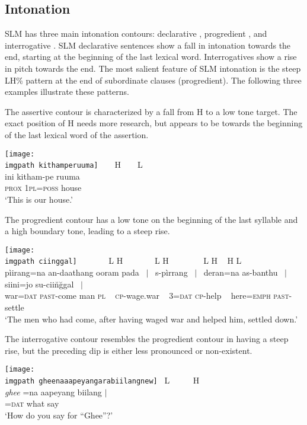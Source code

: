 \subsection{Intonation}
SLM has three main intonation contours: 
declarative , 
progredient , and
interrogative .
SLM declarative sentences show a fall in intonation towards the end, starting at the beginning of the last lexical word. Interrogatives show a rise in pitch towards the end. The most salient feature of SLM intonation is the steep LH\% pattern at the end of subordinate clauses (progredient). The following three examples illustrate these patterns.

The assertive contour is characterized by a fall from H to a low  tone target. The exact position of H needs more research, but appears to be towards the beginning of the last lexical word of the assertion.


\ea \label{ex:phon:int:declarative}
 \texttt{[image: \\imgpath kithamperuuma]}
\glll    ~   ~         H~~~~L\\
	 ini kitham-pe ruuma \\
     \textsc{prox} \textsc{1pl=poss} house  \\
    `This is our house.'
\z


The progredient contour has a low tone on the beginning of the last syllable and a high boundary tone, leading to a steep rise.


\ea \label{ex:phon:int:progredient}
 \texttt{[image: \\imgpath ciinggal]}
\glll 	~ ~	~	~~L	H	~~~~~~~L	H	~	  ~~~~~~L 	H	~	H 		L\\
       pìirang=na an-daathang ooram pada $~\mid~$ s-pìrrang $~\mid~$  deran=na as-banthu $~\mid~$  siini=jo su-cii\u n\u ggal $~\mid$ \\
      war=\textsc{dat} \textsc{past}-come man \textsc{pl} ~ \textsc{cp}-wage.war ~ 3=\textsc{dat} \textsc{cp}-help ~ here=\textsc{emph} \textsc{past}-settle  \\
    `The men who had come, after having waged war and helped him, settled down.' 
\z


The interrogative contour resembles the progredient contour in having a steep rise, but the preceding dip is either less pronounced or non-existent.


\ea \label{ex:phon:int:interrogative}
 \texttt{[image: \\imgpath gheenaaapeyangarabiilangnew]}
\glll       ~L  		~  ~     ~        H \\
	{\em ghee} =na aapeyang biilang $\mid$ \\
    { } =\textsc{dat} what say \\
    `How do you say for ``Ghee''?'
\z



